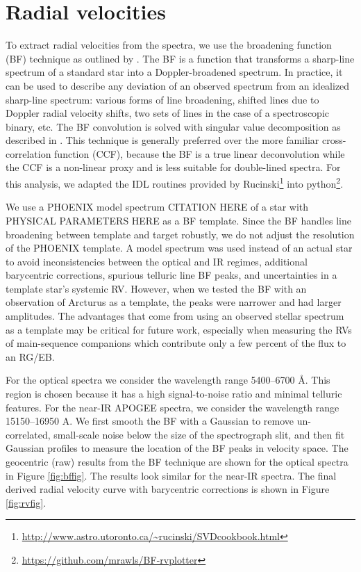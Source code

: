 \section{Radial velocities}\label{rvs}
To extract radial velocities from the spectra, we use the broadening function (BF) technique as outlined by \citet{ruc02}. The BF is a function that transforms a sharp-line spectrum of a standard star into a Doppler-broadened spectrum. In practice, it can be used to describe any deviation of an observed spectrum from an idealized sharp-line spectrum: various forms of line broadening, shifted lines due to Doppler radial velocity shifts, two sets of lines in the case of a spectroscopic binary, etc. The BF convolution is solved with singular value decomposition as described in \citet{ruc02}. This technique is generally preferred over the more familiar cross-correlation function (CCF), because the BF is a true linear deconvolution while the CCF is a non-linear proxy and is less suitable for double-lined spectra. For this analysis, we adapted the IDL routines provided by Rucinski\footnote{\url{http://www.astro.utoronto.ca/~rucinski/SVDcookbook.html}} into python\footnote{\url{https://github.com/mrawls/BF-rvplotter}}.

We use a PHOENIX model spectrum CITATION HERE of a star with PHYSICAL PARAMETERS HERE as a BF template. Since the BF handles line broadening between template and target robustly, we do not adjust the resolution of the PHOENIX template. A model spectrum was used instead of an actual star to avoid inconsistencies between the optical and IR regimes, additional barycentric corrections, spurious telluric line BF peaks, and uncertainties in a template star's systemic RV. However, when we tested the BF with an observation of Arcturus as a template, the peaks were narrower and had larger amplitudes. The advantages that come from using an observed stellar spectrum as a template may be critical for future work, especially when measuring the RVs of main-sequence companions which contribute only a few percent of the flux to an RG/EB.

For the optical spectra we consider the wavelength range 5400--6700 \AA. This region is chosen because it has a high signal-to-noise ratio and minimal telluric features. For the near-IR APOGEE spectra, we consider the wavelength range 15150--16950 A. We first smooth the BF with a Gaussian to remove un-correlated, small-scale noise below the size of the spectrograph slit, and then fit Gaussian profiles to measure the location of the BF peaks in velocity space. The geocentric (raw) results from the BF technique are shown for the optical spectra in Figure \ref{fig:bffig}. The results look similar for the near-IR spectra. The final derived radial velocity curve with barycentric corrections is shown in Figure \ref{fig:rvfig}.
